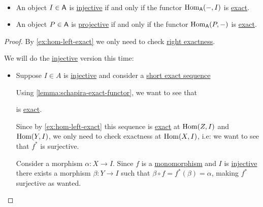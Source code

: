 \documentclass[../../../main]{subfiles}
\begin{document}
\begin{proposition}~
  \begin{itemize}
    \item An object \(I \in \mathsf{A}\) is \hyperref[def:injective-projective-object]{injective} if and only if the functor \(\operatorname{Hom}_{\mathsf{A}}(-, I)\) is \hyperref[def:exact-complex-functor]{exact}.
    \item An object \(P \in \mathsf{A}\) is \hyperref[def:injective-projective-object]{projective} if and only if the functor \(\operatorname{Hom}_{\mathsf{A}}(P, -)\) is \hyperref[def:exact-complex-functor]{exact}.
  \end{itemize}
\end{proposition}
\begin{proof}
  By \autoref{ex:hom-left-exact} we only need to check \hyperref[def:exact-complex-functor]{right exactness}.

  We will do the \hyperref[def:injective-projective-object]{injective} version this time:
  \begin{itemize}
    \item[\(\implies\)] Suppose \(I \in A\) is \hyperref[def:injective-projective-object]{injective} and consider a \hyperref[def:short-exact-sequence]{short exact sequence}
          \begin{center}
          \end{center}
          Using \autoref{lemma:schapira-exact-functor}, we want to see that
          \begin{center}
          \end{center}
          is \hyperref[def:exact-complex-sequence]{exact}.

          Since by \autoref{ex:hom-left-exact} this sequence is \hyperref[def:exact-complex-sequence]{exact} at \(\operatorname{Hom}(Z, I)\) and \(\operatorname{Hom}(Y, I)\), we only need to check exactness at \(\operatorname{Hom}(X, I)\), i.e: we want to see that \(f^{\ast}\) is surjective.

          Consider a morphism \(\alpha: X \to I\).
          Since \(f\) is a \hyperref[def:mono-epi-morphism]{monomorphism} and \(I\) is \hyperref[def:injective-projective-object]{injective} there exists a morphism \(\beta: Y \to I\) such that \(\beta \circ f = f^{\ast}(\beta) = \alpha\), making \(f^{\ast}\) surjective as wanted.


\end{itemize}
\end{proof}
\end{document}
